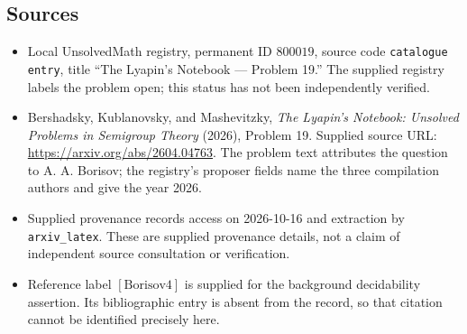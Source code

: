 \documentclass[11pt]{article}
\begin{document}
\subsection{Sources}
\begin{itemize}
\item Local UnsolvedMath registry, permanent ID \(800019\), source code \texttt{catalogue entry}, title ``The Lyapin's Notebook --- Problem 19.'' The supplied registry labels the problem open; this status has not been independently verified.
\item Bershadsky, Kublanovsky, and Mashevitzky, \emph{The Lyapin's Notebook: Unsolved Problems in Semigroup Theory} (2026), Problem 19. Supplied source URL: \url{https://arxiv.org/abs/2604.04763}. The problem text attributes the question to A. A. Borisov; the registry's proposer fields name the three compilation authors and give the year 2026.
\item Supplied provenance records access on 2026-10-16 and extraction by \texttt{arxiv\_latex}. These are supplied provenance details, not a claim of independent source consultation or verification.
\item Reference label \([\mathrm{Borisov4}]\) is supplied for the background decidability assertion. Its bibliographic entry is absent from the record, so that citation cannot be identified precisely here.
\end{itemize}
\end{document}

